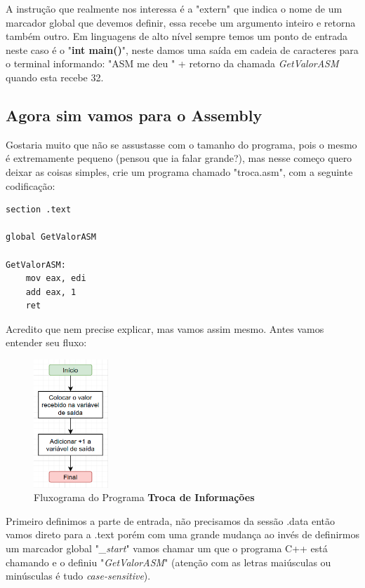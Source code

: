 A instrução que realmente nos interessa é a "extern" que indica o nome de um marcador global que devemos definir, essa recebe um argumento inteiro e retorna também outro. Em linguagens de alto nível sempre temos um ponto de entrada neste caso é o "\textbf{int main()}", neste damos uma saída em cadeia de caracteres para o terminal informando: "ASM me deu " + retorno da chamada \textit{GetValorASM} quando esta recebe 32.

\subsection{Agora sim vamos para o Assembly}
Gostaria muito que não se assustasse com o tamanho do programa, pois o mesmo é extremamente pequeno (pensou que ia falar grande?), mas nesse começo quero deixar as coisas simples, crie um programa chamado "troca.asm", com a seguinte codificação:
\begin{lstlisting}[]
section .text

global GetValorASM

GetValorASM:
	mov eax, edi
	add eax, 1
	ret	
\end{lstlisting}

Acredito que nem precise explicar, mas vamos assim mesmo. Antes vamos entender seu fluxo:
\begin{figure}[H]
	\centering
	\includegraphics[width=0.25\textwidth]{Pictures/cap02/programa21}
	\caption{Fluxograma do Programa \textbf{Troca de Informações}}
\end{figure}

Primeiro definimos a parte de entrada, não precisamos da sessão .data então vamos direto para a .text porém com uma grande mudança ao invés de definirmos um marcador global "\textit{\_start}" vamos chamar um que o programa C++ está chamando e o definiu "\textit{GetValorASM}" (atenção com as letras maiúsculas ou minúsculas é tudo \textit{case-sensitive}). 

